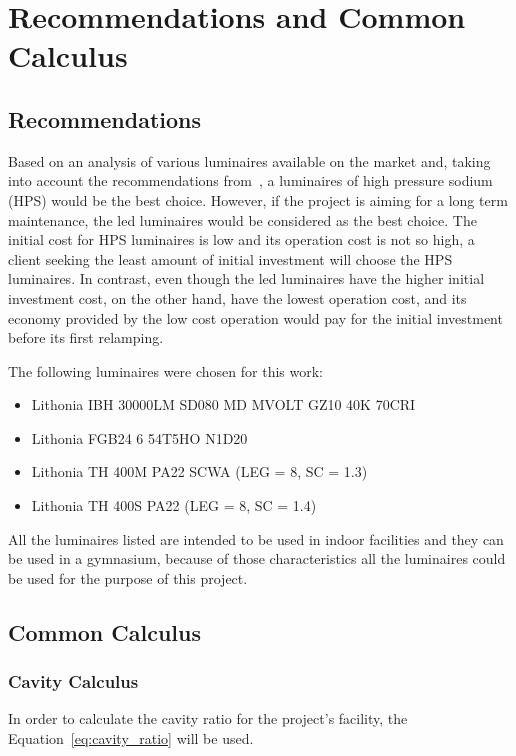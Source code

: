 \chapter{Recommendations and Common Calculus}

\section{Recommendations}
Based on an analysis of various luminaires available on the market and, taking into account the recommendations from~\cite{www:fifa_light_spec}, a luminaires of high pressure sodium (HPS) would be the best choice. However, if the project is aiming for a long term maintenance, the led luminaires would be considered as the best choice. The initial cost for HPS luminaires is low and its operation cost is not so high, a client seeking the least amount of initial investment will choose the HPS luminaires. In contrast, even though the led luminaires have the higher initial investment cost, on the other hand, have the lowest operation cost, and its economy provided by the low cost operation would pay for the initial investment before its first relamping.

The following luminaires were chosen for this work:
\begin{itemize}
  \item Lithonia IBH 30000LM SD080 MD MVOLT GZ10 40K 70CRI~\cite{www:led_spec}
  \item Lithonia FGB24 6 54T5HO N1D20~\cite{www:fluo_lumin_spec,www:fluo_lamp_spec}
  \item Lithonia TH 400M PA22 SCWA (LEG = 8, SC = 1.3)~\cite{www:mh_hps_lumin_spec,www:mh_lamp_spec}
  \item Lithonia TH 400S PA22 (LEG = 8, SC = 1.4)~\cite{www:mh_hps_lumin_spec,www:hps_lamp_spec}
\end{itemize}
All the luminaires listed are intended to be used in indoor facilities and they can be used in a gymnasium, because of those characteristics all the luminaires could be used for the purpose of this project.

\section{Common Calculus}
\subsection{Cavity Calculus}
In order to calculate the cavity ratio for the project's facility, the Equation~\ref{eq:cavity_ratio} will be used.

